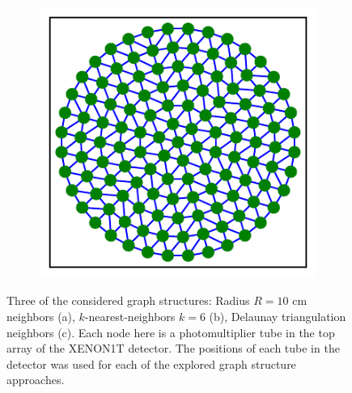\documentclass[thesis.tex]{subfiles}
\begin{document}
\begin{figure}[t]
\begin{subfigure}{0.32\textwidth}
		\caption{}
	\end{subfigure}
	\begin{subfigure}{0.32\textwidth}
		\includegraphics[width=\textwidth]{figures/1T_delaunay-graph.pdf}
		\caption{}
	\end{subfigure}
	\caption{
	Three of the considered graph structures: Radius $R=10$ cm neighbors (a), $k$-nearest-neighbors $k=6$ (b), Delaunay triangulation neighbors (c).
	Each node here is a photomultiplier tube in the top array of the XENON1T detector.
	The positions of each tube in the detector was used for each of the explored graph structure approaches.
	}
	\label{fig:graph_structs}
\end{figure}
\end{document}
